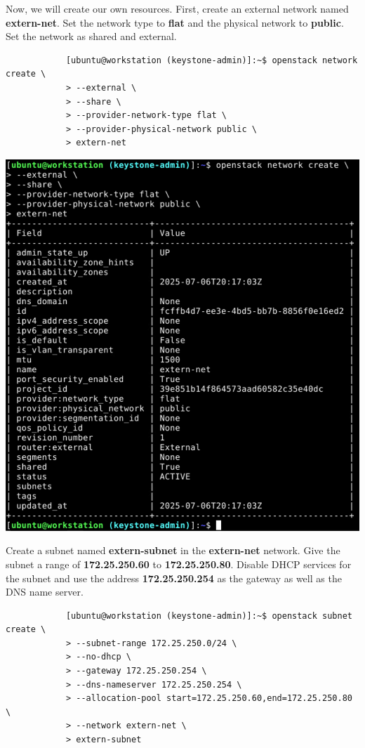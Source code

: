 \documentclass[letterpaper, 12pt]{article}
\begin{document}
\begin{enumerate}
    \begin{labstep}
        Now, we will create our own resources.
        First, create an external network named \textbf{extern-net}.
        Set the network type to \textbf{flat} and the physical network to \textbf{public}.
        Set the network as shared and external.
        \begin{lstlisting}
            [ubuntu@workstation (keystone-admin)]:~$ openstack network create \
            > --external \
            > --share \
            > --provider-network-type flat \
            > --provider-physical-network public \
            > extern-net
        \end{lstlisting}

        \begin{center}
            \includegraphics[width=\linewidth]{images/part1/step13.png}
        \end{center}
    \end{labstep}

    \begin{labstep}
        Create a subnet named \textbf{extern-subnet} in the \textbf{extern-net} network.
        Give the subnet a range of \textbf{172.25.250.60} to \textbf{172.25.250.80}.
        Disable DHCP services for the subnet and use the address \textbf{172.25.250.254} as the gateway as well as the DNS name server.
        \begin{lstlisting}
            [ubuntu@workstation (keystone-admin)]:~$ openstack subnet create \
            > --subnet-range 172.25.250.0/24 \
            > --no-dhcp \
            > --gateway 172.25.250.254 \
            > --dns-nameserver 172.25.250.254 \
            > --allocation-pool start=172.25.250.60,end=172.25.250.80 \
            > --network extern-net \
            > extern-subnet
        \end{lstlisting}


\end{labstep}
\end{enumerate}
\end{document}
